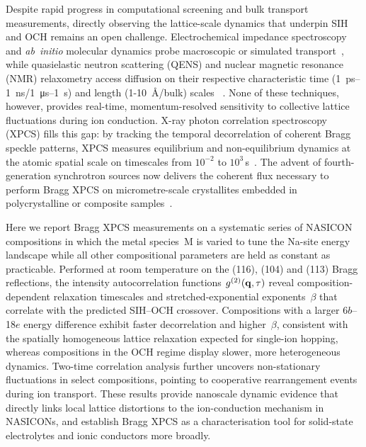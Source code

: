 Despite rapid progress in computational screening and bulk transport
measurements, directly observing the lattice-scale dynamics that underpin SIH
and OCH remains an open challenge.  Electrochemical impedance spectroscopy and
\textit{ab~initio} molecular dynamics probe macroscopic or simulated
transport~\cite{Wang2023,Fang2025}, while quasielastic neutron scattering (QENS) and
nuclear magnetic resonance (NMR) relaxometry access diffusion on their respective characteristic time (\SI{1}{\pico\second}--\SI{1}{\nano\second}/\SI{1}{\micro\second}--\SI{1}{\second}) and
length (1-\SI{10}{\angstrom}/bulk) scales ~\cite{Pivarnikova2025,Kaus2017}.  None of these techniques,
however, provides real-time, momentum-resolved sensitivity to collective
lattice fluctuations during ion conduction.  X-ray photon correlation
spectroscopy (XPCS) fills this gap: by tracking the temporal decorrelation of
coherent Bragg speckle patterns, XPCS measures equilibrium and
non-equilibrium dynamics at the atomic spatial scale on timescales from
$10^{-2}$ to $10^{3}$\,s~\cite{Shpyrko2014,Sandy2018}.  The advent of
fourth-generation synchrotron sources now delivers the coherent flux necessary
to perform Bragg XPCS on micrometre-scale crystallites embedded in
polycrystalline or composite samples~\cite{Sandy2018}.

Here we report Bragg XPCS measurements on a systematic series of NASICON
compositions in which the metal species~M is varied to tune the Na-site energy
landscape while all other compositional parameters are held as constant as
practicable.  Performed at room temperature on the (116), (104) and (113)
Bragg reflections, the intensity autocorrelation functions
$g^{(2)}(\mathbf{q},\tau)$ reveal composition-dependent relaxation timescales and
stretched-exponential exponents~$\beta$ that correlate with the predicted
SIH--OCH crossover.  Compositions with a larger 6$b$--18$e$ energy difference
exhibit faster decorrelation and higher~$\beta$, consistent with the spatially
homogeneous lattice relaxation expected for single-ion hopping, whereas
compositions in the OCH regime display slower, more heterogeneous dynamics.
Two-time correlation analysis further uncovers non-stationary fluctuations in
select compositions, pointing to cooperative rearrangement events during ion
transport.  These results provide nanoscale dynamic evidence that directly
links local lattice distortions to the ion-conduction mechanism in NASICONs,
and establish Bragg XPCS as a characterisation tool for solid-state
electrolytes and ionic conductors more broadly.
